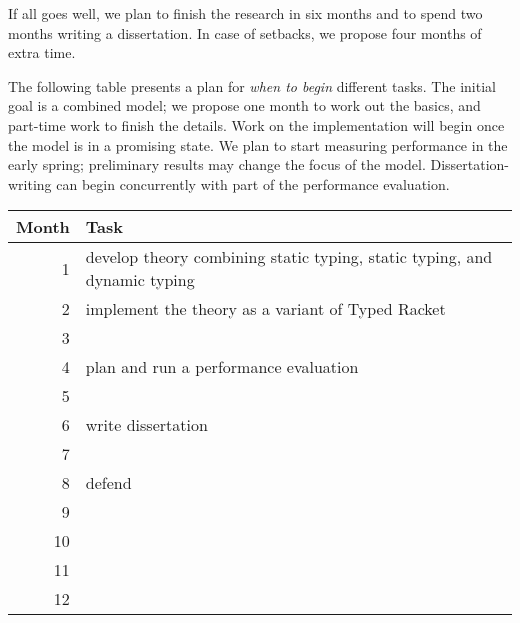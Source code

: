 If all goes well, we plan to finish the research in six months and to spend two
 months writing a dissertation.
In case of setbacks, we propose four months of extra time.

The following table presents a plan for \emph{when to begin}\/ different tasks.
The initial goal is a combined model; we propose one month to work out the
 basics, and part-time work to finish the details.
Work on the implementation will begin once the model is in a promising state.
We plan to start measuring performance in the early spring;
 preliminary results may change the focus of the model.
Dissertation-writing can begin concurrently with part of the performance
 evaluation.

\begin{tabular}{rl}
  Month & Task \\\hline
  1     & develop theory combining \tdeep{} static typing, \tshallow{} static typing, and dynamic typing
  \\
  2     & implement the theory as a variant of Typed Racket
  \\
  3     &
  \\
  4     & plan and run a performance evaluation
  \\
  5     &
  \\
  6     & write dissertation
  \\
  7     &
  \\
  8     & defend
  \\
  9     &
  \\
  10    &
  \\
  11    &
  \\
  12    &
\end{tabular}
